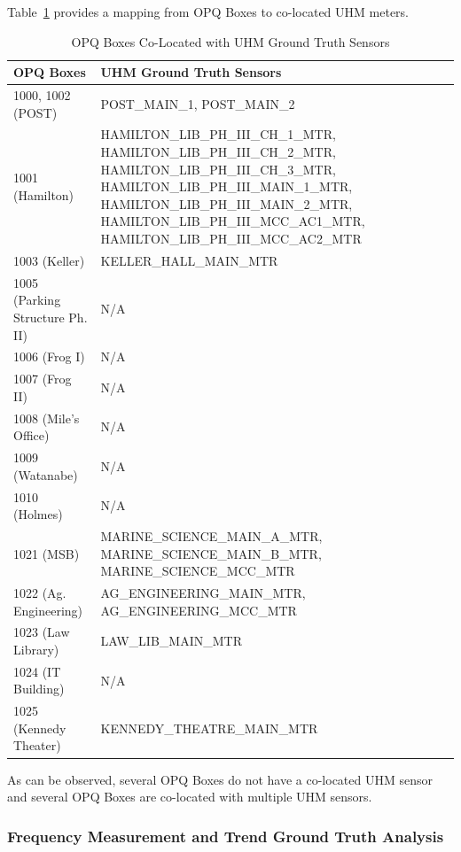 Table~\ref{table:gt} provides a mapping from OPQ Boxes to co-located UHM meters.

\begin{table}[H]
    \centering
    \caption{OPQ Boxes Co-Located with UHM Ground Truth Sensors}
    \begin{tabularx}{\textwidth}{lX}
        \toprule
        \textbf{OPQ Boxes} & \textbf{UHM Ground Truth Sensors} \\
        \midrule
        1000, 1002 (POST) & POST\_MAIN\_1, POST\_MAIN\_2 \\
        1001 (Hamilton) & HAMILTON\_LIB\_PH\_III\_CH\_1\_MTR, HAMILTON\_LIB\_PH\_III\_CH\_2\_MTR, HAMILTON\_LIB\_PH\_III\_CH\_3\_MTR, HAMILTON\_LIB\_PH\_III\_MAIN\_1\_MTR, HAMILTON\_LIB\_PH\_III\_MAIN\_2\_MTR, HAMILTON\_LIB\_PH\_III\_MCC\_AC1\_MTR, HAMILTON\_LIB\_PH\_III\_MCC\_AC2\_MTR \\
        1003 (Keller) & KELLER\_HALL\_MAIN\_MTR \\
        1005 (Parking Structure Ph. II) & N/A \\
        1006 (Frog I) & N/A \\
        1007 (Frog II) & N/A \\
        1008 (Mile's Office) & N/A \\
        1009 (Watanabe) & N/A \\
        1010 (Holmes) & N/A \\
        1021 (MSB) & MARINE\_SCIENCE\_MAIN\_A\_MTR, MARINE\_SCIENCE\_MAIN\_B\_MTR, MARINE\_SCIENCE\_MCC\_MTR \\
        1022 (Ag. Engineering) & AG\_ENGINEERING\_MAIN\_MTR, AG\_ENGINEERING\_MCC\_MTR \\
        1023 (Law Library) & LAW\_LIB\_MAIN\_MTR \\
        1024 (IT Building) & N/A \\
        1025 (Kennedy Theater) & KENNEDY\_THEATRE\_MAIN\_MTR \\
        \bottomrule
    \end{tabularx}
    \label{table:gt}
\end{table}

As can be observed, several OPQ Boxes do not have a co-located UHM sensor and several OPQ Boxes are co-located with multiple UHM sensors.

\subsubsection{Frequency Measurement and Trend Ground Truth Analysis}

